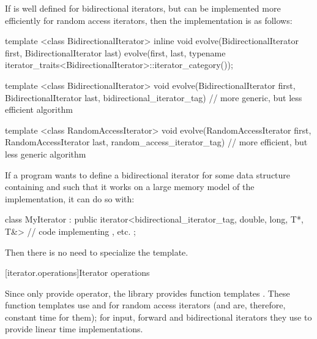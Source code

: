{\color{oldoldclr}
\pnum
\enterexample
If
is well defined for bidirectional iterators, but can be implemented more
efficiently for random access iterators, then the implementation is as
follows:

\begin{codeblock}
template <class BidirectionalIterator>
inline void
evolve(BidirectionalIterator first, BidirectionalIterator last) {
  evolve(first, last,
    typename iterator_traits<BidirectionalIterator>::iterator_category());
}

template <class BidirectionalIterator>
void evolve(BidirectionalIterator first, BidirectionalIterator last,
  bidirectional_iterator_tag) {
  // more generic, but less efficient algorithm
}

template <class RandomAccessIterator>
void evolve(RandomAccessIterator first, RandomAccessIterator last,
  random_access_iterator_tag) {
  // more efficient, but less generic algorithm
}
\end{codeblock}
\exitexample

\pnum
\enterexample
If a \Cpp program wants to define a bidirectional iterator for some data structure containing
and such that it
works on a large memory model of the implementation, it can do so with:

\begin{codeblock}
class MyIterator :
  public iterator<bidirectional_iterator_tag, double, long, T*, T&> {
  // code implementing \tcode{++}, etc.
};
\end{codeblock}

\pnum
Then there is no need to specialize the
 template.
\exitexample
} %

[iterator.operations]{Iterator operations}

\pnum
Since only  provide \tcode{+}  \tcode{-}
operator, the library provides  function templates
\added{,}
.
These
function templates
use
\tcode{+}
and
\tcode{-}
for random access iterators (and are, therefore, constant
time for them); for input, forward and bidirectional iterators they use
\tcode{++}
to provide linear time
implementations.

